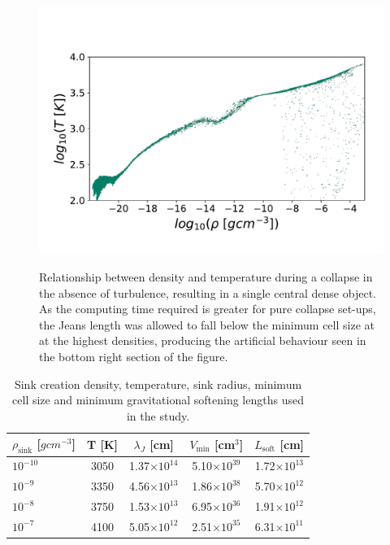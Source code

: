 \documentclass[fleqn,usenatbib]{mnras}
\begin{document}
\begin{figure}
	\hbox{\hspace{-0.8cm} \includegraphics[scale=0.5]{simple.pdf}}
    \caption{Relationship between density and temperature during a collapse in the absence of turbulence, resulting in a single central dense object. As the computing time required is greater for pure collapse set-ups, the Jeans length was allowed to fall below the minimum cell size at at the highest densities, producing the artificial behaviour seen in the bottom right section of the figure.}
    \label{fig:simple}
\end{figure}

\begin{table}
	\centering
	\caption{Sink creation density, temperature, sink radius, minimum cell size and minimum gravitational softening lengths used in the study.}
	\label{table:1}
	\begin{tabular}{lcccr} %
		\hline
		$\rho_{\text{sink}}$ [$gcm^{-3}$] & T [K] & $\lambda_J$ [cm] & $V_{\text{min}}$ [cm$^{3}$] & $L_{\text{soft}}$ [cm]\\
		\hline
		$10^{-10}$ & 3050 & 1.37$\times 10^{14}$ & 5.10$\times 10^{39}$ & 1.72$\times 10^{13}$\\
		$10^{-9}$ & 3350 & 4.56$\times 10^{13}$ & 1.86$\times 10^{38}$ & 5.70$\times 10^{12}$\\
		$10^{-8}$ & 3750 & 1.53$\times 10^{13}$ & 6.95$\times 10^{36}$ & 1.91$\times 10^{12}$\\
		$10^{-7}$ & 4100 & 5.05$\times 10^{12}$ & 2.51$\times 10^{35}$ & 6.31$\times 10^{11}$\\
		\hline
	\end{tabular}
\end{table}
\end{document}
